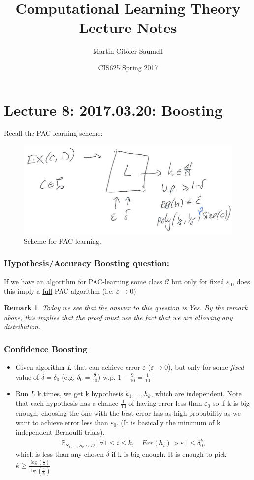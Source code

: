 \documentclass[12pt, letterpaper]{article}
\title{Computational Learning Theory Lecture Notes}
\author{Martin Citoler-Saumell}
\date{CIS625 Spring 2017}
\numberwithin{equation}{section} %
\newcommand{\ul}{\underline}
\newcommand{\mb}{\mathbb}
\newcommand{\mc}{\mathcal}
\newcommand{\ve}{\varepsilon}
\newtheorem{remark}[theorem]{Remark}
\theoremstyle{definition}
\theoremstyle{remark}
\begin{document}
\section{Lecture 8: 2017.03.20: Boosting}
Recall the PAC-learning scheme:
\begin{figure}[H]
\centering
\includegraphics[width=0.6\linewidth]{../img/pac-learning.png}
\caption{Scheme for PAC learning.}
\end{figure}


\subsubsection*{Hypothesis/Accuracy Boosting question:}
If we have an algorithm for PAC-learning some class $\mc C$ but only for \ul{fixed} $\ve_0$, does this imply a \ul{full} PAC algorithm (i.e. $\ve\to 0$)
\begin{remark}
Today we see that the answer to this question is Yes. By the remark above, this implies that the proof must use the fact that we are allowing \emph{any} distribution.
\end{remark}

\subsubsection{Confidence Boosting}
\begin{itemize}
\item Given algorithm $L$ that can achieve error $\ve$ ($\ve\to0$), but only for some \emph{fixed} value of $\delta=\delta_0$ (e.g. $\delta_0=\frac9{10}$) w.p. $1 - \frac9{10} = \frac1{10}$
\item Run $L$ k times, we get k hypothesis $h_1,\ldots,h_k$, which are independent. Note that each hypothesis has a chance $\frac1{10}$ of having error less than $\ve_0$ so if k is big enough, choosing the one with the best error has as high probability as we want to achieve error less than $\ve_0$. (It is basically the minimum of k independent Bernoulli trials).
\begin{align}
\mb P_{S_1,\ldots, S_k\sim D}\left[\forall 1\leq i \leq k, \quad Err(h_i)>\ve\right]\leq \delta_0^k,
\end{align}
which is less than any chosen $\delta$ if k is big enough. It is enough to pick $k\geq \frac{\log\left(\frac1\delta\right)}{\log\left(\frac1{\delta_0}\right)}$
\end{itemize}
\end{document}
